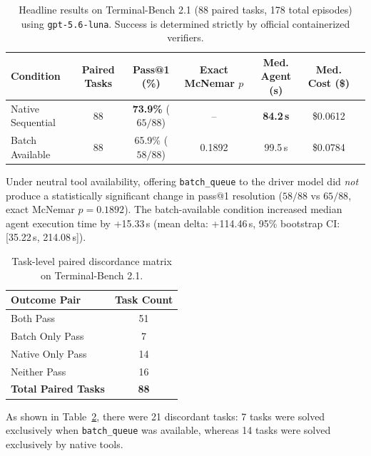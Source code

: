 \documentclass{article}
\begin{document}
\begin{table}[ht]
\centering
\caption{Headline results on Terminal-Bench 2.1 (88 paired tasks, 178 total episodes) using \texttt{gpt-5.6-luna}. Success is determined strictly by official containerized verifiers.}
\label{tab:tb_headline}
\small
\begin{tabular}{lcccccc}
\toprule
\textbf{Condition} & \textbf{Paired Tasks} & \textbf{Pass@1 (\%)} & \textbf{Exact McNemar $p$} & \textbf{Med. Agent (s)} & \textbf{Med. Cost (\$)} \\
\midrule
Native Sequential & 88 & \textbf{73.9\%} ($65/88$) & -- & \textbf{84.2\,s} & \$0.0612 \\
Batch Available & 88 & 65.9\% ($58/88$) & 0.1892 & 99.5\,s & \$0.0784 \\
\bottomrule
\end{tabular}
\end{table}

Under neutral tool availability, offering \texttt{batch\_queue} to the driver model did \emph{not} produce a statistically significant change in pass@1 resolution ($58/88$ vs $65/88$, exact McNemar $p = 0.1892$). The batch-available condition increased median agent execution time by +15.33\,s (mean delta: +114.46\,s, 95\% bootstrap CI: [35.22\,s, 214.08\,s]).

\begin{table}[ht]
\centering
\caption{Task-level paired discordance matrix on Terminal-Bench 2.1.}
\label{tab:discordance}
\small
\begin{tabular}{lc}
\toprule
\textbf{Outcome Pair} & \textbf{Task Count} \\
\midrule
Both Pass & 51 \\
Batch Only Pass & 7 \\
Native Only Pass & 14 \\
Neither Pass & 16 \\
\textbf{Total Paired Tasks} & \textbf{88} \\
\bottomrule
\end{tabular}
\end{table}

As shown in Table~\ref{tab:discordance}, there were 21 discordant tasks: 7 tasks were solved exclusively when \texttt{batch\_queue} was available, whereas 14 tasks were solved exclusively by native tools.
\end{document}
